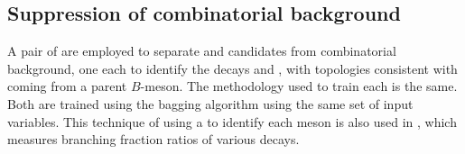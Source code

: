 






\subsection{Suppression of combinatorial background}
A pair of  are employed to
separate \dstokkpi and \phitokk candidates from combinatorial background, one each to identify the
decays \dstokkpi and \phitokk, with topologies consistent with coming from a parent $B$-meson.
The methodology used to train each \bdt is the same.
Both are trained using the bagging algorithm using the same set of input variables.
This technique of using a \bdt to identify each meson is also used in
, which measures branching fraction ratios of various  decays.

